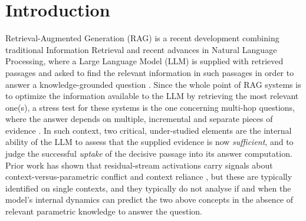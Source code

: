 \section{Introduction}
\label{sec:intro}
Retrieval-Augmented Generation (RAG) is a recent development combining traditional Information Retrieval and recent advances in Natural Language Processing, where a Large Language Model (LLM) is supplied with retrieved passages and asked to find the relevant information in such passages in order to answer a knowledge-grounded question \cite{NEURIPS2020_6b493230}. Since the whole point of RAG systems is to optimize the information available to the LLM by retrieving the most relevant one(s), a stress test for these systems is the one concerning multi-hop questions, where the answer depends on multiple, incremental and separate pieces of evidence \cite{trivedi2022musique}. In such context, two critical, under-studied elements are the internal ability of the LLM to assess that the supplied evidence is now \emph{sufficient}, and to judge the successful \emph{uptake} of the decisive passage into its answer computation. Prior work has shown that residual-stream activations carry signals about context-versus-parametric conflict and context reliance \cite{context-vs-memory,SpARE}, but these are typically identified on single contexts, and they typically do not analyse if and when the model's internal dynamics can predict the two above concepts in the absence of relevant parametric knowledge to answer the question.

